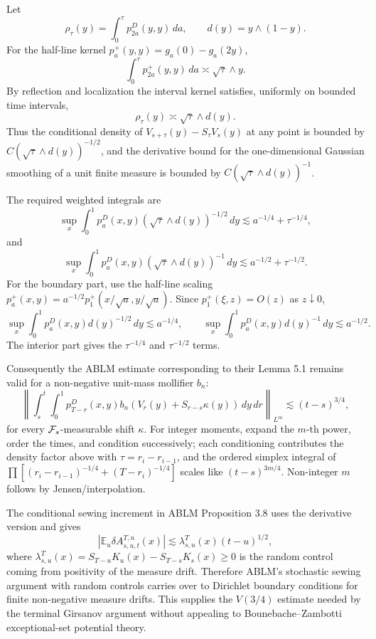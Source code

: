 \documentclass[12pt]{article}
\begin{document}
Let
\[
  \rho_\tau(y)=\int_0^\tau p^D_{2a}(y,y)\,da,\qquad d(y)=y\wedge(1-y).
\]
For the half-line kernel \(p^{+}_a(y,y)=g_a(0)-g_a(2y)\),
\[
  \int_0^\tau p^{+}_{2a}(y,y)\,da\asymp \sqrt{\tau}\wedge y .
\]
By reflection and localization the interval kernel satisfies, uniformly on
bounded time intervals,
\[
  \rho_\tau(y)\asymp \sqrt{\tau}\wedge d(y).
\]
Thus the conditional density of
\(V_{s+\tau}(y)-S_\tau V_s(y)\) at any point is bounded by
\(C(\sqrt{\tau}\wedge d(y))^{-1/2}\), and the derivative bound for the
one-dimensional Gaussian smoothing of a unit finite measure is bounded by
\(C(\sqrt{\tau}\wedge d(y))^{-1}\).

The required weighted integrals are
\[
 \sup_x\int_0^1p^D_a(x,y)(\sqrt{\tau}\wedge d(y))^{-1/2}\,dy
 \lesssim a^{-1/4}+\tau^{-1/4},
\]
and
\[
 \sup_x\int_0^1p^D_a(x,y)(\sqrt{\tau}\wedge d(y))^{-1}\,dy
 \lesssim a^{-1/2}+\tau^{-1/2}.
\]
For the boundary part, use the half-line scaling
\(p_a^+(x,y)=a^{-1/2}p_1^+(x/\sqrt a,y/\sqrt a)\).  Since
\(p_1^+(\xi,z)=O(z)\) as \(z\downarrow0\),
\[
 \sup_x\int_0^1p^D_a(x,y)d(y)^{-1/2}\,dy\lesssim a^{-1/4},\qquad
 \sup_x\int_0^1p^D_a(x,y)d(y)^{-1}\,dy\lesssim a^{-1/2}.
\]
The interior part gives the \(\tau^{-1/4}\) and \(\tau^{-1/2}\) terms.

Consequently the ABLM estimate corresponding to their Lemma 5.1 remains
valid for a non-negative unit-mass mollifier \(b_n\):
\[
 \left\|\int_s^t\!\!\int_0^1p^D_{T-r}(x,y)
 b_n(V_r(y)+S_{r-s}\kappa(y))\,dy\,dr\right\|_{L^m}
 \lesssim (t-s)^{3/4},
\]
for every \({\cal F}_s\)-measurable shift \(\kappa\).  For integer moments,
expand the \(m\)-th power, order the times, and condition successively; each
conditioning contributes the density factor above with
\(\tau=r_i-r_{i-1}\), and the ordered simplex integral of
\(\prod[(r_i-r_{i-1})^{-1/4}+(T-r_i)^{-1/4}]\) scales like
\((t-s)^{3m/4}\).  Non-integer \(m\) follows by Jensen/interpolation.

The conditional sewing increment in ABLM Proposition 3.8 uses the derivative
version and gives
\[
  |\mathbb E_u\delta A^{T,n}_{s,u,t}(x)|
   \lesssim \lambda^T_{s,u}(x)(t-u)^{1/2},
\]
where
\(\lambda^T_{s,u}(x)=S_{T-u}K_u(x)-S_{T-s}K_s(x)\ge0\) is the random
control coming from positivity of the measure drift.  Therefore ABLM's
stochastic sewing argument with random controls carries over to Dirichlet
boundary conditions for finite non-negative measure drifts.  This supplies
the \(V(3/4)\) estimate needed by the terminal Girsanov argument without
appealing to Bounebache--Zambotti exceptional-set potential theory.
\end{document}
